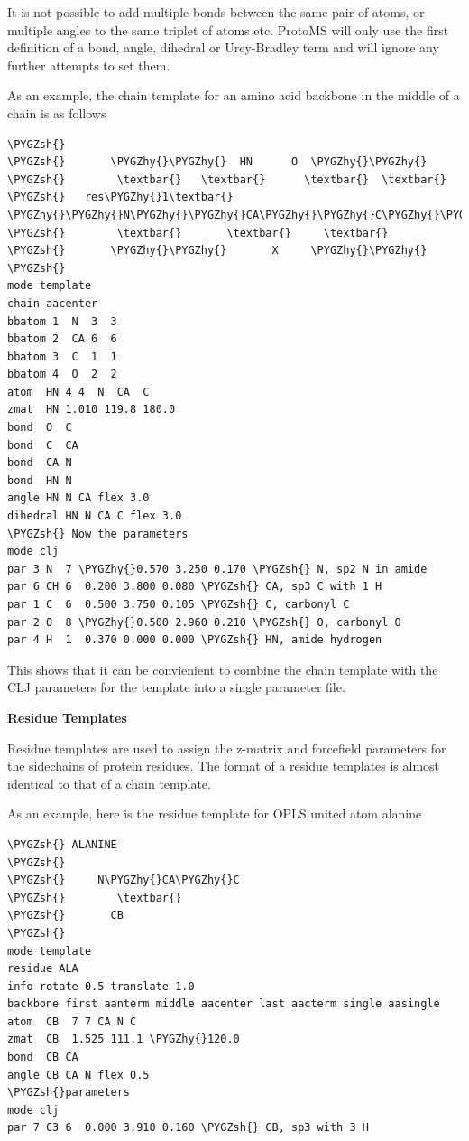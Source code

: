 \documentclass[letterpaper,10pt,english]{sphinxmanual}
\def\PYGZsh{\char`\#}
\def\PYGZhy{\char`\-}
\begin{document}
It is not possible to add multiple bonds between the same pair of atoms, or multiple angles to the same triplet of atoms etc. ProtoMS will only use the first definition of a bond, angle, dihedral or Urey-Bradley term and will ignore any further attempts to set them.

As an example, the chain template for an amino acid backbone in the middle of a chain is as follows

\begin{Verbatim}[frame=single,commandchars=\\\{\}]
\PYGZsh{}
\PYGZsh{}       \PYGZhy{}\PYGZhy{}  HN      O  \PYGZhy{}\PYGZhy{}
\PYGZsh{}        \textbar{}   \textbar{}      \textbar{}  \textbar{}
\PYGZsh{}   res\PYGZhy{}1\textbar{} \PYGZhy{}\PYGZhy{}N\PYGZhy{}\PYGZhy{}CA\PYGZhy{}\PYGZhy{}C\PYGZhy{}\PYGZhy{}\textbar{}res+1
\PYGZsh{}        \textbar{}       \textbar{}     \textbar{}
\PYGZsh{}       \PYGZhy{}\PYGZhy{}       X     \PYGZhy{}\PYGZhy{}
\PYGZsh{}
mode template
chain aacenter
bbatom 1  N  3  3
bbatom 2  CA 6  6
bbatom 3  C  1  1
bbatom 4  O  2  2
atom  HN 4 4  N  CA  C
zmat  HN 1.010 119.8 180.0
bond  O  C
bond  C  CA
bond  CA N
bond  HN N
angle HN N CA flex 3.0
dihedral HN N CA C flex 3.0
\PYGZsh{} Now the parameters
mode clj
par 3 N  7 \PYGZhy{}0.570 3.250 0.170 \PYGZsh{} N, sp2 N in amide
par 6 CH 6  0.200 3.800 0.080 \PYGZsh{} CA, sp3 C with 1 H
par 1 C  6  0.500 3.750 0.105 \PYGZsh{} C, carbonyl C
par 2 O  8 \PYGZhy{}0.500 2.960 0.210 \PYGZsh{} O, carbonyl O
par 4 H  1  0.370 0.000 0.000 \PYGZsh{} HN, amide hydrogen
\end{Verbatim}

This shows that it can be convienient to combine the chain template with the CLJ parameters for the template into a single parameter file.

\textbf{Residue Templates}

Residue templates are used to assign the z-matrix and forcefield parameters for the sidechains of protein residues. The format of a residue templates is almost identical to that of a chain template.

As an example, here is the residue template for OPLS united atom alanine

\begin{Verbatim}[frame=single,commandchars=\\\{\}]
\PYGZsh{} ALANINE
\PYGZsh{}
\PYGZsh{}     N\PYGZhy{}CA\PYGZhy{}C
\PYGZsh{}        \textbar{}
\PYGZsh{}       CB
\PYGZsh{}
mode template
residue ALA
info rotate 0.5 translate 1.0
backbone first aanterm middle aacenter last aacterm single aasingle
atom  CB  7 7 CA N C
zmat  CB  1.525 111.1 \PYGZhy{}120.0
bond  CB CA
angle CB CA N flex 0.5
\PYGZsh{}parameters
mode clj
par 7 C3 6  0.000 3.910 0.160 \PYGZsh{} CB, sp3 with 3 H
\end{Verbatim}
\end{document}
